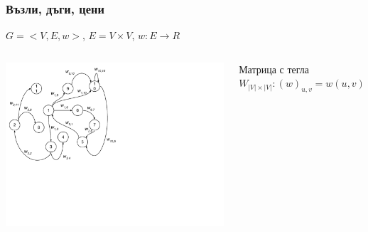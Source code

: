 \documentclass{beamer}
\begin{document}
\begin{frame}[fragile]
\frametitle{Възли, дъги, цени}

\begin{center}
  $G=<V,E,w>$, $E=V \times V$, $w:E \rightarrow R$
\end{center}

\begin{columns}[t]
  \begin{column}{0.55\textwidth}
    \includegraphics[width=13cm]{images/graph_numbers_weight}
  \end{column}
  \begin{column}{0.45\textwidth}
    \begin{flushleft}

    \vspace{-250px}
      Матрица с тегла
      $W_{|V|\times|V|}:(w)_{u,v}=w(u,v)$
      
    \end{flushleft}
  \end{column}
\end{columns}



\end{frame}
\end{document}
